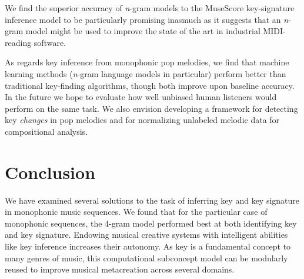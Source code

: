 \documentclass[letterpaper]{article}
\begin{document}
We find the superior accuracy of \emph{n}-gram models to the MuseScore key-signature inference model to be particularly promising inasmuch as it suggests that an \emph{n}-gram model might be used to improve the state of the art in industrial MIDI-reading software.

As regards key inference from monophonic pop melodies, we find that machine learning methods (\emph{n}-gram language models in particular) perform better than traditional key-finding algorithms, though both improve upon baseline accuracy. In the future we hope to evaluate how well unbiased human listeners would perform on the same task. We also envision developing a framework for detecting key \emph{changes} in pop melodies and for normalizing unlabeled melodic data for compositional analysis. 

\section{Conclusion}

We have examined several solutions to the task of inferring key and key signature in monophonic music sequences. We found that for the particular case of monophonic sequences, the 4-gram model performed best at both identifying key and key signature. Endowing musical creative systems with intelligent abilities like key inference increases their autonomy. As key is a fundamental concept to many genres of music, this computational subconcept model can be modularly reused to improve musical metacreation across several domains.



\end{document}
